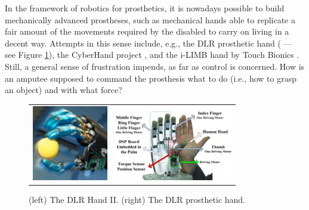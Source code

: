 In the framework of robotics for prosthetics, it is nowadays possible
to build mechanically advanced prostheses, such as mechanical hands
able to replicate a fair amount of the movements required by the
disabled to carry on living in a decent way.  Attempts in this sense
include, e.g., the DLR prosthetic hand (\cite{Hua2006} --- see Figure
\ref{fig:DLRHandII}), the CyberHand project \cite{cyberhand}, and the
i-LIMB hand by Touch Bionics \cite{ilimb}. Still, a general sense of
frustration impends, as far as control is concerned. How is an amputee
supposed to command the prosthesis what to do (i.e., how to grasp an
object) and with what force?

\begin{figure}
  \begin{tabular}{cc}
    \includegraphics[height=3.3cm]{figs/DLRHand-Ball-comp.jpg} &
    \includegraphics[height=3.3cm]{figs/DLR-Prothese.jpg}
  \end{tabular}
  \caption{(left) The DLR Hand II. (right) The DLR prosthetic hand.}
  \label{fig:DLRHandII}
\end{figure}

